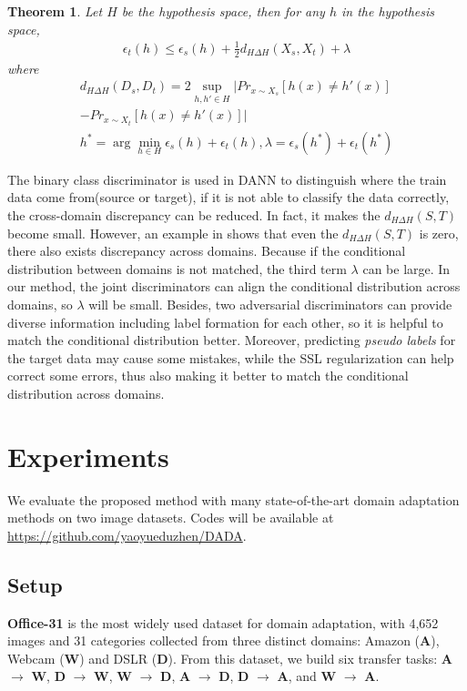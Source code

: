 \documentclass{ecai}
\begin{document}
\newtheorem{thm}{\bf Theorem}
\begin{thm}
Let $H$ be the hypothesis space, then for any $h$ in the hypothesis space,
\begin{align}
\epsilon_t(h) \leq \epsilon_s(h) + \frac{1}{2}d_{H \Delta H}(X_s,X_t) + \lambda
\end{align}
where
\begin{align*}
d_{H \Delta H}(D_s,D_t) = 2 \sup _{h,h' \in H}|Pr_{x \sim X_s}[h(x) \neq h'(x)] \\
- Pr_{x \sim X_t}[h(x) \neq h'(x)] | \\
h^* =  \arg \min_{h \in H} \epsilon_s(h) + \epsilon_t(h),  \lambda = \epsilon_s(h^*) + \epsilon_t(h^*)
\end{align*}
\end{thm}
 The binary class discriminator  is used in DANN to distinguish where the train data come from(source or target), if it is not able to classify the data correctly, the cross-domain discrepancy can be reduced. In fact, it makes the $d_{H \Delta H}(S,T)$ become small. However, an example in \cite{b31} shows that even the $d_{H \Delta H}(S,T)$ is zero, there also exists discrepancy across domains. Because if the conditional distribution between domains is not matched, the third term $\lambda$ can be large. In our method, the joint discriminators can align the conditional distribution across domains, so $\lambda$ will be small. Besides, two adversarial discriminators can provide diverse information including label formation for each other, so it is helpful to match the conditional distribution better. Moreover, predicting {\emph{pseudo labels}} for the target data may cause some mistakes, while the SSL  regularization can help correct some errors, thus also making it better to match the conditional distribution across domains.






\section{Experiments}



We evaluate the proposed method with many state-of-the-art domain adaptation methods on two image datasets. Codes will be available at  \url{https://github.com/yaoyueduzhen/DADA}.

\subsection{Setup}
\textbf{Office-31}\cite{b32} is the most widely used dataset for domain adaptation, with 4,652 images and 31 categories collected from three distinct domains: Amazon (\textbf{A}), Webcam (\textbf{W}) and DSLR (\textbf{D}). From this dataset, we build six transfer tasks: \textbf{A} $\rightarrow$ \textbf{W}, \textbf{D} $\rightarrow$ \textbf{W}, \textbf{W} $\rightarrow$ \textbf{D}, \textbf{A} $\rightarrow$ \textbf{D}, \textbf{D} $\rightarrow$ \textbf{A}, and \textbf{W} $\rightarrow$ \textbf{A}.
\end{document}
